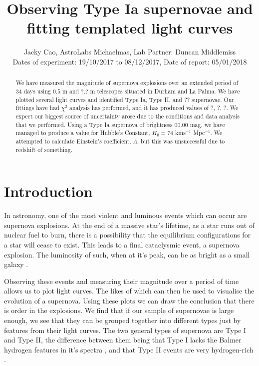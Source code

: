 \documentclass[twocolumn]{revtex4}
\begin{document}
\textheight=26.385cm

\title{Observing Type Ia supernovae and fitting templated light curves}
 
\author{Jacky Cao, AstroLabs Michaelmas, Lab Partner: Duncan Middlemiss \\ Dates of experiment: 19/10/2017 to 08/12/2017, Date of report: 05/01/2018}

\begin{abstract}              
We have measured the magnitude of supernova explosions over an extended period of 34 days using $0.5$ m and $?.?$ m telescopes situated in Durham and La Palma. We have plotted several light curves and identified Type Ia, Type II, and ?? supernovae. Our fittings have had $\chi^2$ analysis has performed, and it has produced values of ?, ?, ?. We expect our biggest source of uncertainty arose due to the conditions and data analysis that we performed. Using a Type Ia supernova of brightness $00.00$ mag, we have managed to produce a value for Hubble's Constant, $H_0 = 74$ kms$^{-1}$ Mpc$^{-1}$. We attempted to calculate Einstein's coefficient, $\Lambda$, but this was unsuccessful due to redshift of something.
\end{abstract}

\maketitle

\vspace{-3ex}
\section{Introduction} 
\label{intro}
\vspace{-2ex}
In astronomy, one of the most violent and luminous events which can occur are supernova explosions. At the end of a massive star's lifetime, as a star runs out of nuclear fuel to burn, there is a possibility that the equilibrium configurations for a star will cease to exist. This leads to a final cataclysmic event, a supernova explosion. The luminosity of such, when at it's peak, can be as bright as a small galaxy \cite{longair}.

Observing these events and measuring their magnitude over a period of time allows us to plot light curves. The likes of which can then be used to visualise the evolution of a supernova. Using these plots we can draw the conclusion that there is order in the explosions. We find that if our sample of supernovae is large enough, we see that they can be grouped together into different types just by features from their light curves. The two general types of supernova are Type I and Type II, the difference between them being that Type I lacks the Balmer hydrogen features in it's spectra \cite{longair}, and that Type II events are very hydrogen-rich \cite{obs_phys_class_sn}.
\end{document}
